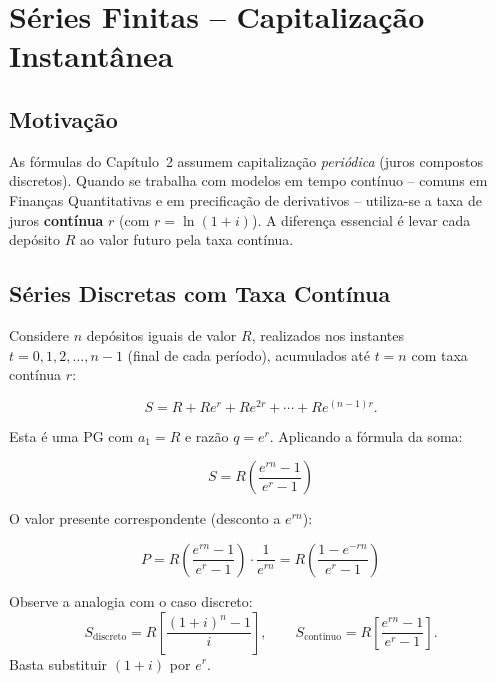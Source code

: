 
\chapter{Séries Finitas -- Capitalização Instantânea}

\section{Motivação}

As fórmulas do Capítulo~2 assumem capitalização \emph{periódica} (juros compostos discretos).
Quando se trabalha com modelos em tempo contínuo -- comuns em Finanças Quantitativas e em
precificação de derivativos -- utiliza-se a taxa de juros \textbf{contínua} $r$ (com $r = \ln(1+i)$).
A diferença essencial é levar cada depósito $R$ ao valor futuro pela taxa contínua.

\section{Séries Discretas com Taxa Contínua}

Considere $n$ depósitos iguais de valor $R$, realizados nos instantes $t = 0, 1, 2, \ldots, n-1$
(final de cada período), acumulados até $t = n$ com taxa contínua $r$:

\[
  S = R + R e^r + R e^{2r} + \cdots + R e^{(n-1)r}.
\]

Esta é uma PG com $a_1 = R$ e razão $q = e^r$. Aplicando a fórmula da soma:

\begin{resultado}
\[
  \boxed{S = R \left(\frac{e^{rn} - 1}{e^r - 1}\right)}
\]
\end{resultado}

O valor presente correspondente (desconto a $e^{rn}$):
\begin{resultado}
\[
  \boxed{P = R \left(\frac{e^{rn} - 1}{e^r - 1}\right) \cdot \frac{1}{e^{rn}}
           = R \left(\frac{1 - e^{-rn}}{e^r - 1}\right)}
\]
\end{resultado}

\begin{nota}
Observe a analogia com o caso discreto:
\[
  S_{\text{discreto}} = R\left[\frac{(1+i)^n-1}{i}\right], \qquad
  S_{\text{contínuo}} = R\left[\frac{e^{rn}-1}{e^r-1}\right].
\]
Basta substituir $(1+i)$ por $e^r$.
\end{nota}

